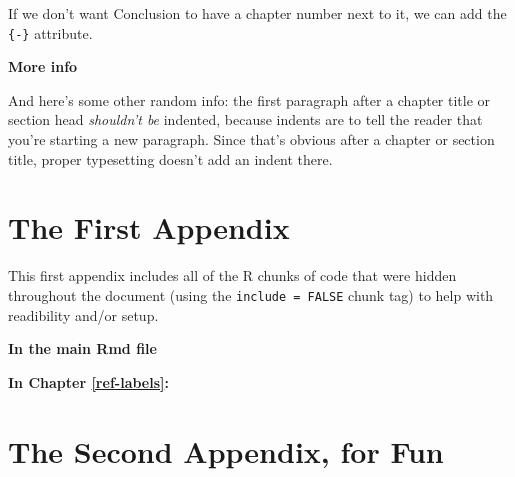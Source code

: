 \documentclass[12pt,twoside]{reedthesis}
\newenvironment{Shaded}{\begin{snugshade}}{\end{snugshade}}
\newcommand{\CommentTok}[1]{\textcolor[rgb]{0.56,0.35,0.01}{\textit{#1}}}
\newcommand{\ControlFlowTok}[1]{\textcolor[rgb]{0.13,0.29,0.53}{\textbf{#1}}}
\newcommand{\DataTypeTok}[1]{\textcolor[rgb]{0.13,0.29,0.53}{#1}}
\newcommand{\KeywordTok}[1]{\textcolor[rgb]{0.13,0.29,0.53}{\textbf{#1}}}
\newcommand{\NormalTok}[1]{#1}
\newcommand{\OperatorTok}[1]{\textcolor[rgb]{0.81,0.36,0.00}{\textbf{#1}}}
\newcommand{\OtherTok}[1]{\textcolor[rgb]{0.56,0.35,0.01}{#1}}
\newcommand{\StringTok}[1]{\textcolor[rgb]{0.31,0.60,0.02}{#1}}
\theoremstyle{definition}
\theoremstyle{definition}
\theoremstyle{definition}
\theoremstyle{remark}
\begin{document}
If we don't want Conclusion to have a chapter number next to it, we can
add the \texttt{\{-\}} attribute.

\textbf{More info}

And here's some other random info: the first paragraph after a chapter
title or section head \emph{shouldn't be} indented, because indents are
to tell the reader that you're starting a new paragraph. Since that's
obvious after a chapter or section title, proper typesetting doesn't add
an indent there.

\appendix

\hypertarget{the-first-appendix}{%
\chapter{The First Appendix}\label{the-first-appendix}}

This first appendix includes all of the R chunks of code that were
hidden throughout the document (using the \texttt{include\ =\ FALSE}
chunk tag) to help with readibility and/or setup.

\textbf{In the main Rmd file}
\begin{Shaded}
\end{Shaded}
\textbf{In Chapter \ref{ref-labels}:}

\hypertarget{the-second-appendix-for-fun}{%
\chapter{The Second Appendix, for
Fun}\label{the-second-appendix-for-fun}}
\end{document}

